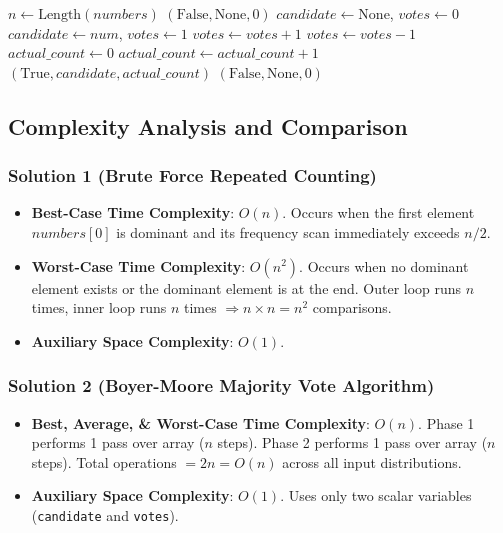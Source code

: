 \begin{algorithm}[H]
\caption{Solution 2: Boyer-Moore Majority Vote Algorithm ($O(n)$ Time, $O(1)$ Space)}
\begin{algorithmic}[1]
    \State $n \gets \text{Length}(numbers)$
     \Return $(\text{False}, \text{None}, 0)$ \EndIf
    \State $candidate \gets \text{None}$, $votes \gets 0$ 
            \State $candidate \gets num$, $votes \gets 1$
            \State $votes \gets votes + 1$
        \Else
            \State $votes \gets votes - 1$
        \EndIf
    \EndFor
    \State $actual\_count \gets 0$ 
            \State $actual\_count \gets actual\_count + 1$
        \EndIf
    \EndFor
        \State \Return $(\text{True}, candidate, actual\_count)$
    \Else
        \State \Return $(\text{False}, \text{None}, 0)$
    \EndIf
\EndFunction
\end{algorithmic}
\end{algorithm}

\subsection{Complexity Analysis and Comparison}

\subsubsection{Solution 1 (Brute Force Repeated Counting)}
\begin{itemize}
    \item \textbf{Best-Case Time Complexity}: $O(n)$.
    Occurs when the first element $numbers[0]$ is dominant and its frequency scan immediately exceeds $n/2$.
    \item \textbf{Worst-Case Time Complexity}: $O(n^2)$.
    Occurs when no dominant element exists or the dominant element is at the end. Outer loop runs $n$ times, inner loop runs $n$ times $\Rightarrow n \times n = n^2$ comparisons.
    \item \textbf{Auxiliary Space Complexity}: $O(1)$.
\end{itemize}

\subsubsection{Solution 2 (Boyer-Moore Majority Vote Algorithm)}
\begin{itemize}
    \item \textbf{Best, Average, \& Worst-Case Time Complexity}: $O(n)$.
    Phase 1 performs 1 pass over array ($n$ steps). Phase 2 performs 1 pass over array ($n$ steps). Total operations $= 2n = O(n)$ across all input distributions.
    \item \textbf{Auxiliary Space Complexity}: $O(1)$.
    Uses only two scalar variables (\texttt{candidate} and \texttt{votes}).
\end{itemize}


